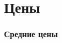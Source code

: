 \section{Цены}

\begin{frame}
    \frametitle{Средние цены}
    \begin{center}
    
    \end{center}
\end{frame}